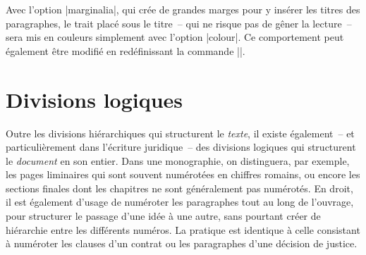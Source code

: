 \begin{macro}
\renewcommand{\chaptercolour}{}%
\end{macro}

\begin{noprint}
\newcommand{\bookcolour}{\if@modern\if@colourall\maincolour\fi\fi}
\newcommand{\partcolour}{\if@modern\if@colourall\maincolour\fi\fi}
\newcommand{\headingcolour}{\if@modern\if@colourall\maincolour\fi\fi}
\newcommand{\subheadingcolour}{\if@modern\if@colourall\maincolour\fi\fi}
\newcommand{\chaptercolour}{\if@modern\if@colourall\maincolour\fi\fi}
\newcommand{\sectioncolour}{\if@modern\if@colourall\maincolour\fi\fi}
\newcommand{\subsectioncolour}{\if@modern\if@colourall\maincolour\fi\fi}
\newcommand{\subsubsectioncolour}{\if@modern\if@colourall\maincolour\fi\fi}
\newcommand{\paragraphcolour}{\if@modern\if@colourall\maincolour\fi\fi}
\newcommand{\subparagraphcolour}{\if@modern\if@colourall\maincolour\fi\fi}
\end{noprint}

Avec l'option |marginalia|, qui crée de grandes marges pour y insérer les titres des paragraphes, le trait placé sous le titre~-- qui ne risque pas de gêner la lecture~-- sera mis en couleurs simplement avec l'option |colour|. Ce comportement peut également être modifié en redéfinissant la commande |\marginaliacolour|.

\begin{noprint}
\newcommand{\marginaliacolour}{\if@colour\maincolour\fi}
\end{noprint}



\section{Divisions logiques}

Outre les divisions hiérarchiques qui structurent le \emph{texte}, il existe également~-- et particulièrement dans l'écriture juridique~-- des divisions logiques qui structurent le \emph{document} en son entier. Dans une monographie, on distinguera, par exemple, les pages liminaires qui sont souvent numérotées en chiffres romains, ou encore les sections finales dont les chapitres ne sont généralement pas numérotés. En droit, il est également d'usage de numéroter les paragraphes tout au long de l'ouvrage, pour structurer le passage d'une idée à une autre, sans pourtant créer de hiérarchie entre les différents numéros. La pratique est identique à celle consistant à numéroter les clauses d'un contrat ou les paragraphes d'une décision de justice.

